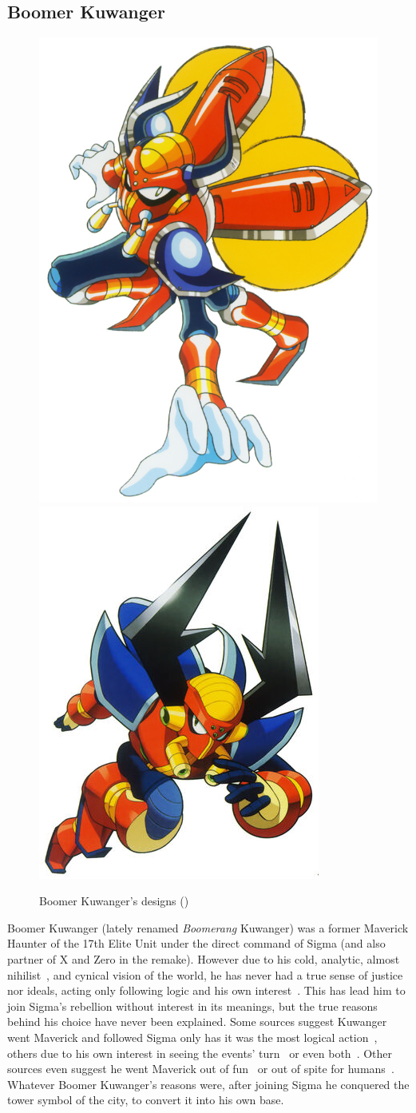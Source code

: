 \subsection{Boomer Kuwanger}\label{boss:Boomer_Kuwanger}
\begin{figure}[htp]
	\centering
	\includegraphics[width=0.4\linewidth]{figures/X1/Boomer_kuwanger/Boomer_kuwanger.jpg}
	\includegraphics[width=0.4\linewidth]{figures/X1/Boomer_kuwanger/MHXBoomerKuwanger.jpg}
	\caption{Boomer Kuwanger's designs (\cite{book:MMX_Complete_art})}
\end{figure}
Boomer Kuwanger (lately renamed \emph{Boomerang} Kuwanger) was a former Maverick Haunter of the 17th Elite Unit under the direct command of Sigma (and also partner of X and Zero in the \mhx remake). However due to his cold, analytic, almost nihilist~\cite{book:MH_field_guide}, and cynical vision of the world, he has never had a true sense of justice nor ideals, acting only following logic and his own interest~\cite{MHX:manual}. This has lead him to join Sigma's rebellion without interest in its meanings, but the true reasons behind his choice have never been explained. Some sources suggest Kuwanger went Maverick and followed Sigma only has it was the most logical action~\cite{MHX:manual}, others due to his own interest in seeing the events' turn~\cite{wiki:Boomer_kuwanger} or even both~\cite{book:MH_field_guide}. Other sources even suggest he went Maverick out of fun~\cite{Xcoll1:Manual_X1} or out of spite for humans~\cite{wayback:X_resources}. Whatever Boomer Kuwanger's reasons were, after joining Sigma he conquered the tower symbol of the city, to convert it into his own base.

